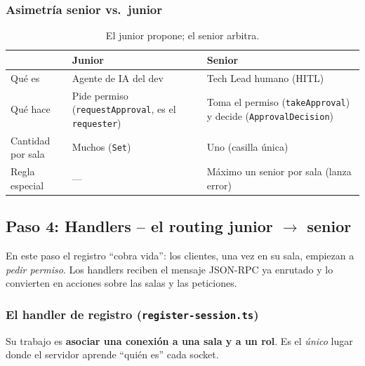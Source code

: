 \documentclass[11pt,a4paper]{article}
\begin{document}
\subsubsection{Asimetría senior vs.\ junior}

\begin{table}[h]
  \centering
  \begin{tabular}{@{}p{3.2cm}p{5.4cm}p{5.4cm}@{}}
    \toprule
    & \textbf{Junior} & \textbf{Senior} \\
    \midrule
    Qué es & Agente de IA del dev & Tech Lead humano (HITL) \\
    Qué hace & Pide permiso (\texttt{requestApproval}, es el \texttt{requester}) &
               Toma el permiso (\texttt{takeApproval}) y decide
               (\texttt{ApprovalDecision}) \\
    Cantidad por sala & Muchos (\texttt{Set}) & Uno (casilla única) \\
    Regla especial & --- & Máximo un senior por sala (lanza error) \\
    \bottomrule
  \end{tabular}
  \caption{El junior propone; el senior arbitra.}
\end{table}

\subsection{Paso 4: Handlers -- el routing junior $\rightarrow$ senior}

En este paso el registro ``cobra vida'': los clientes, una vez en su sala,
empiezan a \emph{pedir permiso}. Los handlers reciben el mensaje JSON-RPC ya
enrutado y lo convierten en acciones sobre las salas y las peticiones.

\subsubsection{El handler de registro (\texttt{register-session.ts})}

Su trabajo es \textbf{asociar una conexión a una sala y a un rol}. Es el
\emph{único} lugar donde el servidor aprende ``quién es'' cada socket.
\end{document}
